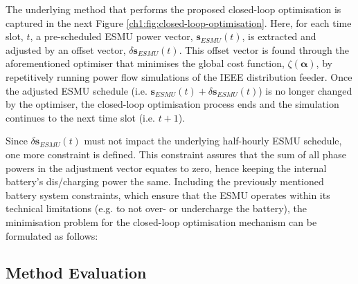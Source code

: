 

The underlying method that performs the proposed closed-loop optimisation is captured in the next Figure \ref{ch1:fig:closed-loop-optimisation}.
Here, for each time slot, $t$, a pre-scheduled ESMU power vector, $\textbf{s}_{ESMU}(t)$, is extracted and adjusted by an offset vector, $\delta \textbf{s}_{ESMU}(t)$.
This offset vector is found through the aforementioned optimiser that minimises the global cost function, $\zeta(\boldsymbol{\alpha})$, by repetitively running power flow simulations of the IEEE distribution feeder.
Once the adjusted ESMU schedule (i.e. $\textbf{s}_{ESMU}(t) + \delta \textbf{s}_{ESMU}(t)$) is no longer changed by the optimiser, the closed-loop optimisation process ends and the simulation continues to the next time slot (i.e. $t+1$).

Since $\delta \textbf{s}_{ESMU}(t)$ must not impact the underlying half-hourly ESMU schedule, one more constraint is defined.
This constraint assures that the sum of all phase powers in the adjustment vector equates to zero, hence keeping the internal battery's dis/charging power the same.
Including the previously mentioned battery system constraints, which ensure that the ESMU operates within its technical limitations (e.g. to not over- or undercharge the battery), the minimisation problem for the closed-loop optimisation mechanism can be formulated as follows:



\subsection{Method Evaluation}





